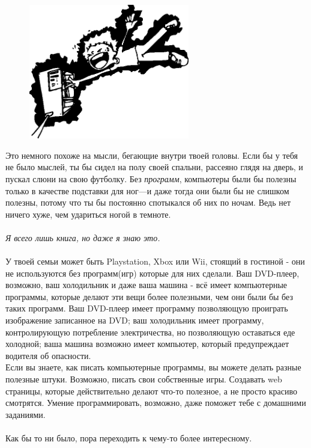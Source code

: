 \begin{figure}
  \begin{center}
    \includegraphics*[width=70mm]{electrocute.eps}
  \end{center}
\end{figure}

Это немного похоже на мысли, бегающие внутри твоей головы. Если бы у тебя не было мыслей, ты бы сидел на полу своей спальни, рассеяно глядя на дверь, и пускал слюни на свою футболку. Без \emph{программ}, компьютеры были бы полезны только в качестве подставки для ног---и даже тогда они были бы не слишком полезны, потому что ты бы постоянно спотыкался об них по ночам. Ведь нет ничего хуже, чем удариться ногой в темноте.
\\
\\
\emph{Я всего лишь книга, но даже я знаю это. }
\\
\\
У твоей семьи может быть Playstation, Xbox или Wii, стоящий в гостиной - они не используются без программ(игр) которые для них сделали. Ваш DVD-плеер, возможно, ваш холодильник и даже ваша машина - всё имеет компьютерные программы, которые делают эти вещи более полезными, чем они были бы без таких программ. Ваш DVD-плеер имеет программу позволяющую проиграть изображение записанное на DVD; ваш холодильник имеет программу, контролирующую потребление электричества, но позволяющую оставаться еде холодной; ваша машина возможно имеет компьютер, который предупреждает водителя об опасности.\\
Если вы знаете, как писать компьютерные программы, вы можете делать разные полезные штуки. Возможно, писать свои собственные игры. Создавать web страницы, которые действительно делают что-то полезное, а не просто красиво смотрятся. Умение программировать, возможно, даже поможет тебе с домашними заданиями.\\
\\
Как бы то ни было, пора переходить к чему-то более интересному.

